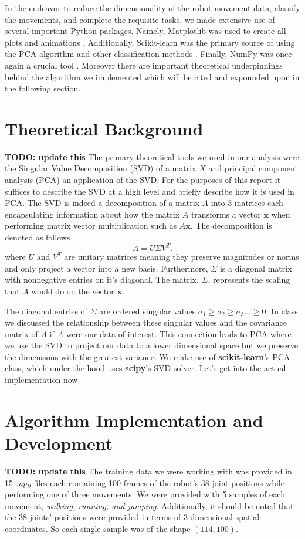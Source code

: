 \documentclass[11pt]{amsart}
\begin{document}
In the endeavor to reduce the dimensionality of the robot movement data, classify the movements, and complete the requisite tasks, we made extensive use of several important Python packages.
Namely, Matplotlib was used to create all plots and animations \cite{Hunter:2007}.
Additionally, Scikit-learn was the primary source of using the PCA algorithm and other classification methods \cite{scikit-learn}. 
Finally, NumPy was once again a crucial tool \cite{harris2020array}.
Moreover there are important theoretical underpinnings behind the algorithm we implemented which will be cited and expounded upon in the following section.

\section{Theoretical Background}\label{sec:theory} \textbf{TODO: update this}
The primary theoretical tools we used in our analysis were the Singular Value Decomposition (SVD) of a matrix $X$ and principal component analysis (PCA) an application of the SVD.
For the purposes of this report it suffices to describe the SVD at a high level and briefly describe how it is used in PCA.
The SVD is indeed a decomposition of a matrix $A$ into 3 matrices each encapsulating information about how the matrix $A$ transforms a vector $\bm x$ when performing matrix vector multiplication such as $A \bm x$.
The decomposition is denoted as follows
\begin{equation}
A = U\Sigma V^T.
\label{eq:svd}
\end{equation}
where $U$ and $V^T$ are unitary matrices meaning they preserve magnitudes or norms and only project a vector into a new basis.
Furthermore, $\Sigma$ is a diagonal matrix with nonnegative entries on it's diagonal.
The matrix, $\Sigma$, represents the scaling that $A$ would do on the vector $\bm x$.

The diagonal entries of $\Sigma$ are ordered singular values $\sigma_1 \geq \sigma_2 \geq \sigma_3 ... \geq 0$.
In class we discussed the relationship between these singular values and the covariance matrix of $A$ if $A$ were our data of interest.
This connection leads to PCA where we use the SVD to project our data to a lower dimensional space but we preserve the dimensions with the greatest variance.
We make use of \textbf{ scikit-learn}'s PCA class, which under the hood uses \textbf{scipy}'s SVD solver.
Let's get into the actual implementation now.

\section{Algorithm Implementation and Development}\label{sec:algorithms} \textbf{TODO: update this}
The training data we were working with was provided in 15 \textit{.npy } files each containing 100 frames of the robot's 38 joint positions while performing one of three movements.
We were provided with 5 samples of each movement, \textit{walking, running, {\rm and } jumping}.
Additionally, it should be noted that the 38 joints' positions were provided in terms of 3 dimensional spatial coordinates.
So each single sample was of the shape $(114,100)$.
\end{document}
